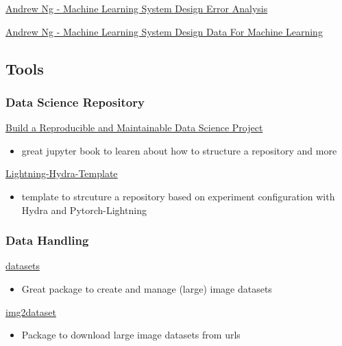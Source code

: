 \documentclass[
  letterpaper,
  DIV=11,
  numbers=noendperiod]{scrartcl}
\providecommand{\tightlist}{%
  \setlength{\itemsep}{0pt}\setlength{\parskip}{0pt}}\usepackage{longtable,booktabs,array}
\begin{document}
\href{https://www.youtube.com/watch?v=k1JGvqr56Yk&list=PLLssT5z_DsK-h9vYZkQkYNWcItqhlRJLN&index=66}{Andrew
Ng - Machine Learning System Design \textbar{} Error Analysis}

\href{https://www.youtube.com/watch?v=5T77nG7YJhk&list=PLLssT5z_DsK-h9vYZkQkYNWcItqhlRJLN&index=69}{Andrew
Ng - Machine Learning System Design \textbar{} Data For Machine
Learning}

\subsection{Tools}\label{tools}

\subsubsection{Data Science Repository}\label{data-science-repository}

\href{https://khuyentran1401.github.io/reproducible-data-science/structure_project/introduction.html}{Build
a Reproducible and Maintainable Data Science Project}

\begin{itemize}
\tightlist
\item
  great jupyter book to learen about how to structure a repository and
  more
\end{itemize}

\href{https://github.com/ashleve/lightning-hydra-template}{Lightning-Hydra-Template}

\begin{itemize}
\tightlist
\item
  template to strcuture a repository based on experiment configuration
  with Hydra and Pytorch-Lightning
\end{itemize}

\subsubsection{Data Handling}\label{data-handling}

\href{https://huggingface.co/docs/datasets/en/index}{datasets}

\begin{itemize}
\tightlist
\item
  Great package to create and manage (large) image datasets
\end{itemize}

\href{https://github.com/rom1504/img2dataset}{img2dataset}

\begin{itemize}
\tightlist
\item
  Package to download large image datasets from urls
\end{itemize}
\end{document}
